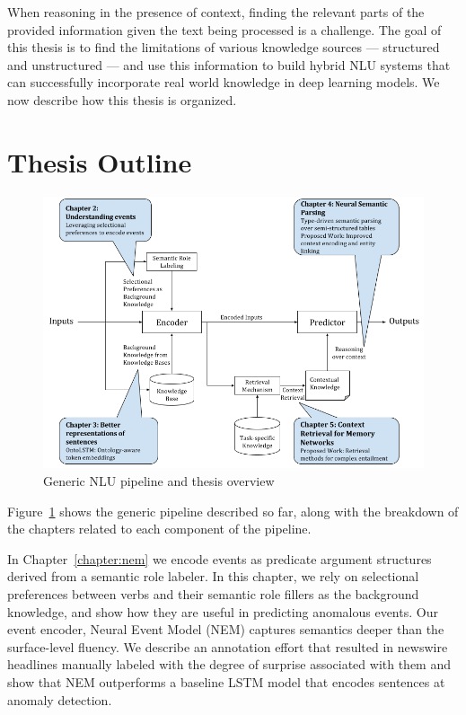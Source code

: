 
When reasoning in the presence of context, finding the 
relevant parts of the provided information given the text being processed is a challenge. 
The goal of this thesis is to find the limitations of various knowledge sources --- structured and unstructured --- and use this information 
to build hybrid NLU systems that can successfully incorporate real world knowledge in deep learning models. We now describe how this thesis is organized.

\section{Thesis Outline}
\begin{figure}
\begin{center}
\includegraphics[width=6.5in]{figures/thesis_overview.png}
\caption{Generic NLU pipeline and thesis overview}
\label{fig:thesis_overview}
\end{center}
\end{figure}
Figure~\ref{fig:thesis_overview} shows the generic pipeline described so far, along with the breakdown of the chapters related to each component
of the pipeline.

In Chapter~\ref{chapter:nem} we encode events as predicate argument structures derived from a semantic role labeler.
In this chapter, we rely on selectional preferences between verbs and their semantic role fillers as the background
knowledge, and show how they are useful in predicting anomalous events.
Our event encoder, Neural Event Model (NEM) captures semantics deeper than the surface-level fluency. We describe an annotation effort that
resulted in newswire headlines manually labeled with the degree of surprise associated with them and show that NEM outperforms
a baseline LSTM model that encodes sentences at anomaly detection. 

